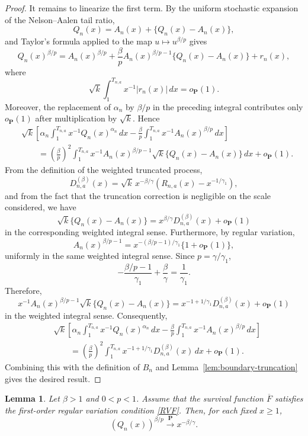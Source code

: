 \documentclass[reqno,openbib,runningheads,a4paper,12pt]{amsart}%
\newtheorem{lemma}{Lemma}[section]
\begin{document}
\begin{proof}
It remains to linearize the first term. By the uniform stochastic expansion of
the Nelson--Aalen tail ratio,
\[
Q_{n}(x)=A_{n}(x)+\{Q_{n}(x)-A_{n}(x)\},
\]
and Taylor's formula applied to the map $u\mapsto u^{\beta/p}$ gives
\[
Q_{n}(x)^{\beta/p}=A_{n}(x)^{\beta/p}+\frac{\beta}{p}A_{n}(x)^{\beta
/p-1}\{Q_{n}(x)-A_{n}(x)\}+r_{n}(x),
\]
where
\[
\sqrt{k}\int_{1}^{T_{n,a}}x^{-1}|r_{n}(x)|\,dx=o_{\mathbf{P}}(1).
\]
Moreover, the replacement of $\alpha_{n}$ by $\beta/p$ in the preceding
integral contributes only $o_{\mathbf{P}}(1)$ after multiplication by
$\sqrt{k}$. Hence
\[
\begin{aligned}
		&\sqrt{k}
		\left[
		\alpha_n\int_{1}^{T_{n,a}}x^{-1}Q_n(x)^{\alpha_n}\,dx
		-
		\frac{\beta}{p}\int_{1}^{T_{n,a}}x^{-1}A_n(x)^{\beta/p}\,dx
		\right] \\
		&\qquad =
		\left(\frac{\beta}{p}\right)^{2}
		\int_{1}^{T_{n,a}}x^{-1}A_n(x)^{\beta/p-1}
		\sqrt{k}\{Q_n(x)-A_n(x)\}\,dx
		+
		o_{\mathbf P}(1).
	\end{aligned}
\]
From the definition of the weighted truncated process,
\[
D_{n,a}^{(\beta)}(x)=\sqrt{k}\,x^{-\beta/\gamma}\left(  R_{n,a}%
(x)-x^{-1/\gamma_{1}}\right)  ,
\]
and from the fact that the truncation correction is negligible on the scale
considered, we have
\[
\sqrt{k}\{Q_{n}(x)-A_{n}(x)\}=x^{\beta/\gamma}D_{n,a}^{(\beta)}%
(x)+o_{\mathbf{P}}(1)
\]
in the corresponding weighted integral sense. Furthermore, by regular
variation,
\[
A_{n}(x)^{\beta/p-1}=x^{-(\beta/p-1)/\gamma_{1}}\{1+o_{\mathbf{P}}(1)\},
\]
uniformly in the same weighted integral sense. Since $p=\gamma/\gamma_{1}$,
\[
-\frac{\beta/p-1}{\gamma_{1}}+\frac{\beta}{\gamma}=\frac{1}{\gamma_{1}}.
\]
Therefore,
\[
x^{-1}A_{n}(x)^{\beta/p-1}\sqrt{k}\{Q_{n}(x)-A_{n}(x)\}=x^{-1+1/\gamma_{1}%
}D_{n,a}^{(\beta)}(x)+o_{\mathbf{P}}(1)
\]
in the weighted integral sense. Consequently,
\[
\begin{aligned}
		&\sqrt{k}
		\left[
		\alpha_n\int_{1}^{T_{n,a}}x^{-1}Q_n(x)^{\alpha_n}\,dx
		-
		\frac{\beta}{p}\int_{1}^{T_{n,a}}x^{-1}A_n(x)^{\beta/p}\,dx
		\right] \\
		&\qquad =
		\left(\frac{\beta}{p}\right)^{2}
		\int_{1}^{T_{n,a}}x^{-1+1/\gamma_1}D_{n,a}^{(\beta)}(x)\,dx
		+
		o_{\mathbf P}(1).
	\end{aligned}
\]
Combining this with the definition of $B_{n}$ and
Lemma~\ref{lem:boundary-truncation} gives the desired result.
\end{proof}

\begin{lemma}
\label{lemma:weighted-power-limit} Let $\beta>1$ and $0<p<1$. Assume that the
survival function $\overline{F}$ satisfies the first-order regular variation
condition \eqref{RVF}. Then, for each fixed $x\geq1$,
\[
\left(  Q_{n}(x)\right)  ^{\beta/p} \overset{\mathbf{P}}{\longrightarrow}
x^{-\beta/\gamma}.
\]

\end{lemma}
\end{document}
